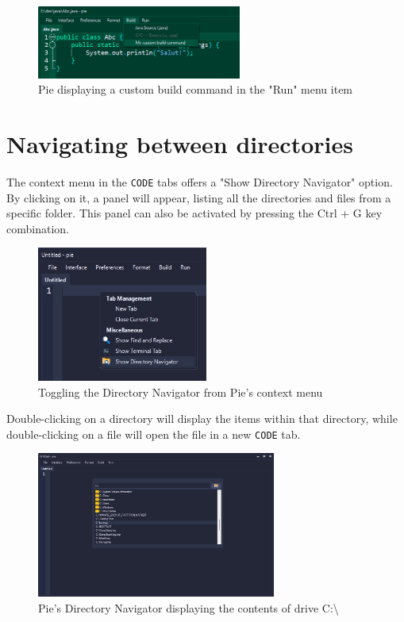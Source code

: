 \begin{figure}[h]
\centering
\includegraphics[width=0.6\textwidth]{images/running-build-command.png}
\caption{Pie displaying a custom build command in the "Run" menu item}
\label{fig:fig2,1.}
\end{figure}

\section{Navigating between directories}

The context menu in the \texttt{CODE} tabs offers a "Show Directory Navigator" option. By clicking on it, a panel will appear, listing all the directories and files from a specific folder. This panel can also be activated by pressing the Ctrl + G key combination.

\begin{figure}[H]
\centering
\includegraphics[width=0.5\textwidth]{images/directory-navigator.jpg}
\caption{Toggling the Directory Navigator from Pie's context menu}
\label{fig:fig2,1.}
\end{figure}

Double-clicking on a directory will display the items within that directory, while double-clicking on a file will open the file in a new \texttt{CODE} tab.

\begin{figure}[H]
\centering
\includegraphics[width=0.7\textwidth]{images/directory-navigator-C.jpg}
\caption{Pie's Directory Navigator displaying the contents of drive C:\textbackslash}
\label{fig:fig2,1.}
\end{figure}

